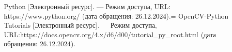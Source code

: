 \begin{thebibliography}{}
	 Python [Электронный ресурс]. — Режим доступа, URL: https://www.python.org/ (дата обращения: 26.12.2024).=
	 OpenCV-Python Tutorials [Электронный ресурс]. — Режим доступа, URL:https://docs.opencv.org/4.x/d6/d00/tutorial\_py\_root.html (дата обращения: 26.12.2024).
\end{thebibliography}
